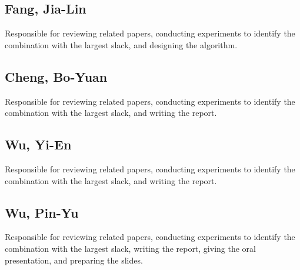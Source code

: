 \documentclass[conference]{IEEEtran}
\begin{document}
\subsection{Fang, Jia-Lin}  
Responsible for reviewing related papers, conducting experiments to identify the combination with the largest slack, and designing the algorithm.

\subsection{Cheng, Bo-Yuan}  
Responsible for reviewing related papers, conducting experiments to identify the combination with the largest slack, and writing the report.

\subsection{Wu, Yi-En}  
Responsible for reviewing related papers, conducting experiments to identify the combination with the largest slack, and writing the report.

\subsection{Wu, Pin-Yu}  
Responsible for reviewing related papers, conducting experiments to identify the combination with the largest slack, writing the report, giving the oral presentation, and preparing the slides.




\end{document}
